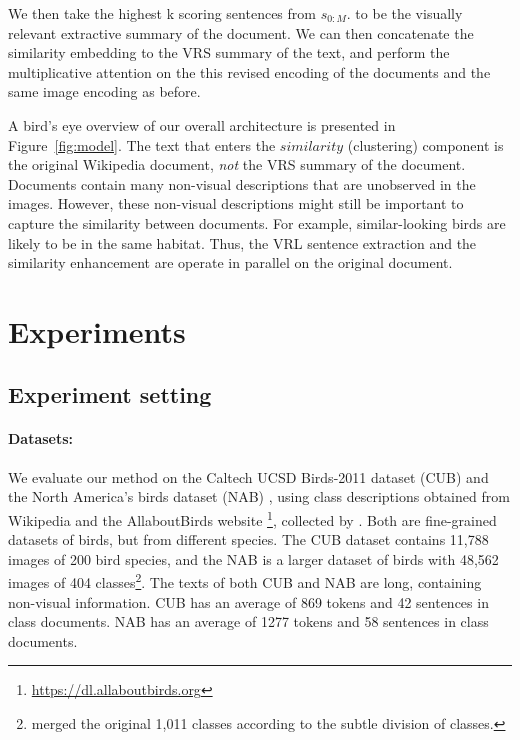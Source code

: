 \documentclass[11pt,a4paper]{article}
\newcommand\gal[1]{\textcolor{bright}{\textbf{GAL:} #1 }}
\newcommand\yuval[1]{\textcolor{darkpink}{\textbf{YUVAL:} #1 }}
\newcommand\tzuf[1]{\textcolor{blue}{\textbf{TZUF:} #1 }}
\newcommand\reut[1]{\textcolor{green}{\textbf{REUT:} #1 }}
\begin{document}
We then take the highest k scoring sentences from \(s_{0:M}\). 
to be the visually relevant extractive summary of the document. We can then concatenate the similarity embedding to the VRS summary of the text, and perform the multiplicative attention on the this revised encoding of the documents and the same image encoding as before.\par

A bird's eye 
overview of our overall architecture is presented in Figure~\ref{fig:model}.
The text that enters the $similarity$ (clustering) component is the original Wikipedia document, {\em not} the VRS summary of the document. Documents contain many non-visual descriptions that are unobserved in the images. However, these non-visual descriptions might still be important to capture the similarity between documents. For example, similar-looking birds are likely to be in the same habitat. Thus, the VRL sentence extraction and the similarity enhancement are operate in parallel on the original document. 
\section{Experiments}

\subsection{Experiment setting}

\paragraph{Datasets:} We evaluate our method on the Caltech UCSD Birds-2011 dataset (CUB) \citet{wah2011caltech} and the North America’s birds dataset (NAB) \cite{van2015building}, using class descriptions obtained from Wikipedia and the AllaboutBirds website \footnote{\url{https://dl.allaboutbirds.org}}, collected by \citet{elhoseiny2017link}. 
Both are fine-grained datasets of birds, but from different species. %
The CUB dataset contains 11,788 images of 200 bird species, and the NAB
is a larger dataset of birds with 48,562 images of 404 classes\footnote{\citet{elhoseiny2017link} merged the original 1,011 classes according to the subtle division of classes.}.
The texts of both CUB and NAB are long, containing non-visual information. CUB has an average of 869 tokens and 42 sentences in class documents. NAB has an average of 1277 tokens and 58 sentences in class documents. 
\end{document}
